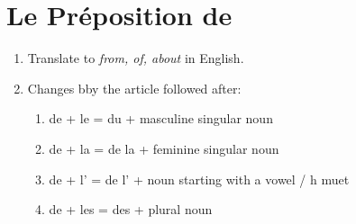 \documentclass{book}
\begin{document}
    \section{Le Préposition de}
        \begin{enumerate}
            \item Translate to \textit{from, of, about} in English.
            \item Changes bby the article followed after:
                \begin{enumerate}
                    \item de + le = du + masculine singular noun
                    \item de + la = de la + feminine singular noun
                    \item de + l' = de l' + noun starting with a vowel / h muet
                    \item de + les = des + plural noun
                \end{enumerate}
        \end{enumerate}
    
\end{document}
